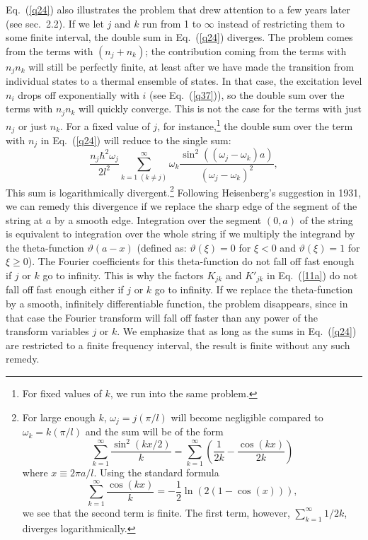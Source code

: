 \documentclass{elsart}
\begin{document}
Eq.\ (\ref{q24}) also illustrates the problem that \citet{Heisenberg 1931} drew attention to a few years later (see sec.\ 2.2). If we let $j$ and $k$ run from 1 to $\infty$ instead of restricting them to some finite interval, the double sum in Eq.\ (\ref{q24}) diverges. The problem comes from the terms with $(n_j + n_k)$; the contribution coming from the terms with $n_j n_k$ will still be perfectly finite, at least after we have made the transition from individual states to a thermal ensemble of states. In that case, the excitation level $n_i$ drops off exponentially with $i$ (see Eq.\ (\ref{q37})), so the double sum over the terms with $n_j n_k$ will quickly converge. This is not the case for the terms with just $n_j$ or just $n_k$. For a fixed value of $j$, for instance,\footnote{For fixed values of $k$, we run into the same problem.} the  double sum over the term with $n_j$ in Eq.\ (\ref{q24}) will reduce to the single sum:
\begin{equation}
\frac{n_j \hbar^2 \omega_j}{2l^2}   \sum_{k=1 \; (k \neq j)}^{\infty} \omega_k   \frac{\sin^2{((\omega_j - \omega_k)a)}}{(\omega_j - \omega_k)^2},
\label{q24a} 
\end{equation}
This sum is logarithmically divergent.\footnote{For large enough $k$, $\omega_j = j (\pi/l)$ will become negligible compared to $\omega_k = k (\pi/l)$ and the sum will be of the form 
$$
\sum_{k=1}^{\infty}  \frac{\sin^2{(k x/2)}}{k}= \sum_{k=1}^{\infty} \left( \frac{1}{2k} - \frac{\cos{(kx)}}{2k} \right)
$$
where $x \equiv 2 \pi a/l$. Using the standard formula
$$
\sum_{k=1}^{\infty} \frac{\cos{(kx)}}{k}= -\frac{1}{2} \ln{(2(1-\cos{(x)}))},
$$  
we see that the second term is finite. The first term, however, 
$
\sum_{k=1}^{\infty} 1/2k
$,
diverges logarithmically.} Following Heisenberg's suggestion in 1931, we can remedy this divergence if we replace the sharp edge of the segment of the string at $a$ by a  smooth edge. Integration over the segment $(0, a)$ of the string is equivalent to integration over the whole string if we multiply the integrand by the theta-function $\vartheta(a - x)$ (defined as: $\vartheta(\xi) = 0$ for $\xi < 0$ and $\vartheta(\xi) = 1$ for $\xi \geq 0$). The Fourier coefficients for this theta-function do not fall off fast enough if $j$ or $k$ go to infinity. This is why the factors $K_{jk}$ and $K'_{jk}$ in Eq.\ (\ref{11a}) do not fall off fast enough either if $j$ or $k$ go to infinity. If we replace the theta-function by a smooth, infinitely differentiable function, the problem disappears, since in that case the Fourier transform will fall off faster than any power of the transform variables $j$ or $k$. We emphasize that as long as the sums in Eq.\ (\ref{q24}) are restricted to a finite frequency interval, the result is finite without any such remedy.
\end{document}
